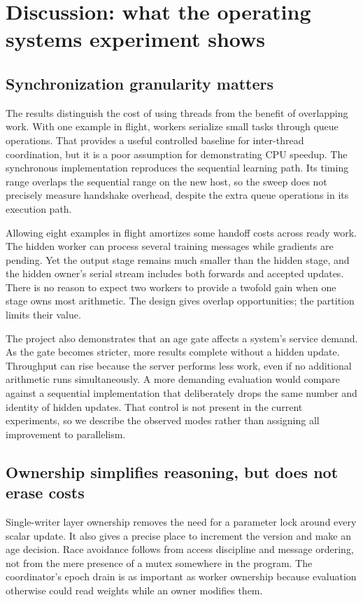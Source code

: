 \documentclass[conference]{IEEEtran}
\begin{document}
\section{Discussion: what the operating systems experiment shows}
\subsection{Synchronization granularity matters}
The results distinguish the cost of using threads from the benefit of overlapping work. With one example in flight, workers serialize small tasks through queue operations. That provides a useful controlled baseline for inter-thread coordination, but it is a poor assumption for demonstrating CPU speedup. The synchronous implementation reproduces the sequential learning path. Its timing range overlaps the sequential range on the new host, so the sweep does not precisely measure handshake overhead, despite the extra queue operations in its execution path.

Allowing eight examples in flight amortizes some handoff costs across ready work. The hidden worker can process several training messages while gradients are pending. Yet the output stage remains much smaller than the hidden stage, and the hidden owner's serial stream includes both forwards and accepted updates. There is no reason to expect two workers to provide a twofold gain when one stage owns most arithmetic. The design gives overlap opportunities; the partition limits their value.

The project also demonstrates that an age gate affects a system's service demand. As the gate becomes stricter, more results complete without a hidden update. Throughput can rise because the server performs less work, even if no additional arithmetic runs simultaneously. A more demanding evaluation would compare against a sequential implementation that deliberately drops the same number and identity of hidden updates. That control is not present in the current experiments, so we describe the observed modes rather than assigning all improvement to parallelism.

\subsection{Ownership simplifies reasoning, but does not erase costs}
Single-writer layer ownership removes the need for a parameter lock around every scalar update. It also gives a precise place to increment the version and make an age decision. Race avoidance follows from access discipline and message ordering, not from the mere presence of a mutex somewhere in the program. The coordinator's epoch drain is as important as worker ownership because evaluation otherwise could read weights while an owner modifies them.
\end{document}
